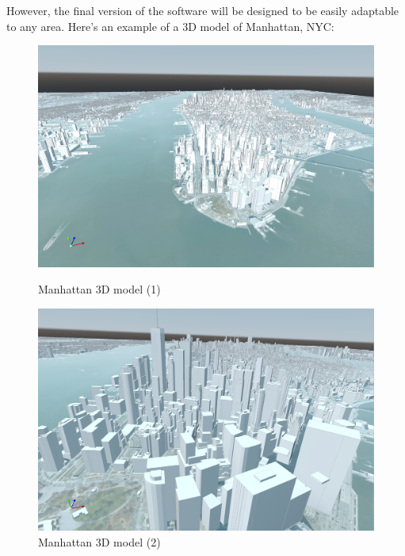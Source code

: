 \documentclass[12pt]{article}
\begin{document}
However, the final version of the software will be designed to be easily adaptable to any area.
Here's an example of a 3D model of Manhattan, NYC:

\begin{figure}[H]
    \centering
    \begin{minipage}{0.45\textwidth}
      \centering
      \includegraphics[width=1\textwidth]{images/mesh-manhattan-1.png}
      \caption{Manhattan 3D model (1)}
    \end{minipage}
    \begin{minipage}{0.45\textwidth}
      \centering
      \includegraphics[width=1\textwidth]{images/mesh-manhattan-2.png}
      \caption{Manhattan 3D model (2)}
    \end{minipage}
\end{figure}
\end{document}
